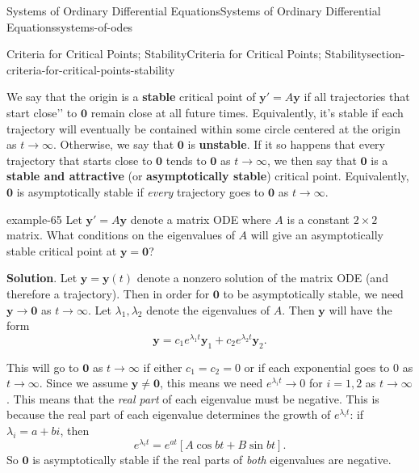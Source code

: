 \documentclass[oneside,10pt,]{book}
\newcommand{\terminology}[1]{\textbf{#1}}
\numberwithin{equation}{section}
\renewcommand{\vec}[1]{\mathbf{#1}}
\begin{document}
\begin{chapterptx}{Systems of Ordinary Differential Equations}{}{Systems of Ordinary Differential Equations}{}{}{systems-of-odes}
\begin{sectionptx}{Criteria for Critical Points; Stability}{}{Criteria for Critical Points; Stability}{}{}{section-criteria-for-critical-points-stability}
\par
\hypertarget{p-387}{}%
We say that the origin is a \terminology{stable} critical point of \(\vec{y}'=A\vec{y}\) if all trajectories that start \textasciigrave{}\textasciigrave{}close'{}'{} to \(\vec{0}\) remain close at all future times. Equivalently, it's stable if each trajectory will eventually be contained within some circle centered at the origin as \(t\to\infty\). Otherwise, we say that \(\vec{0}\) is \terminology{unstable}. If it so happens that every trajectory that starts close to \(\vec{0}\) tends to \(\vec{0}\) as \(t\to\infty\), we then say that \(\vec{0}\) is a \terminology{stable and attractive} (or \terminology{asymptotically stable}) critical point. Equivalently, \(\vec{0}\) is asymptotically stable if \emph{every} trajectory goes to \(\vec{0}\) as \(t\to\infty\).%
\begin{example}{}{example-65}%
\hypertarget{p-388}{}%
Let \(\vec{y}' = A\vec{y}\) denote a matrix ODE where \(A\) is a constant \(2\times2\) matrix. What conditions on the eigenvalues of \(A\) will give an asymptotically stable critical point at \(\vec{y}=\vec{0}\)?%
\par\smallskip%
\noindent\textbf{Solution}.\hypertarget{solution-62}{}\quad%
\hypertarget{p-389}{}%
Let \(\vec{y} = \vec{y}(t)\) denote a nonzero solution of the matrix ODE (and therefore a trajectory). Then in order for \(\vec{0}\) to be asymptotically stable, we need \(\vec{y}\to\vec{0}\) as \(t\to\infty\). Let \(\lambda_{1},\lambda_{2}\) denote the eigenvalues of \(A\). Then \(\vec{y}\) will have the form%
\begin{equation*}
\vec{y} = c_{1}e^{\lambda_{1}t}\vec{y}_{1}+c_{2}e^{\lambda_{2}t}\vec{y}_{2}.
\end{equation*}
%
\par
\hypertarget{p-390}{}%
This will go to \(\vec{0}\) as \(t\to\infty\) if either \(c_{1}=c_{2}=0\) or if each exponential goes to \(0\) as \(t\to\infty\). Since we assume \(\vec{y}\neq\vec{0}\), this means we need \(e^{\lambda_{i}t}\to0\) for \(i=1,2\) as \(t\to\infty\). This means that the \emph{real part} of each eigenvalue must be negative. This is because the real part of each eigenvalue determines the growth of \(e^{\lambda_{i}t}\): if \(\lambda_{i} = a+bi\), then%
\begin{equation*}
e^{\lambda_{i}t} = e^{at}[A\cos bt+B\sin bt]\text{.}
\end{equation*}
So \(\vec{0}\) is asymptotically stable if the real parts of \emph{both} eigenvalues are negative.%
\end{example}

\end{sectionptx}
\end{chapterptx}
\end{document}
